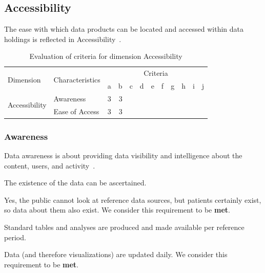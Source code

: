 \newpage
\subsection{Accessibility}

The ease with which data products can be located and accessed within data holdings is reflected in Accessibility~\cite{oecd}.

\begin{table}[htbp]
    \centering

    \begin{tabular}{llrrrrrrrrrr}
        \toprule
        \multirow{2}{*}{Dimension}      & \multirow{2}{*}{Characteristics}  & \multicolumn{10}{c}{Criteria}         \\ \cmidrule(lr){3-12}
                                        &                                   & a & b & c & d & e & f & g & h & i & j \\ \midrule
        \multirow{2}{*}{Accessibility}  & Awareness                         & 3 & 3 &   &   &   &   &   &   &   &   \\
                                        & Ease of Access                    & 3 & 3 &   &   &   &   &   &   &   &   \\
        \bottomrule
    \end{tabular}

    \caption{Evaluation of criteria for dimension Accessibility}
    \label{table:accessibility-benchmark}
\end{table}
\FloatBarrier

\subsubsection{Awareness}

Data awareness is about providing data visibility and intelligence about the content, users, and activity~\cite{data-awareness}.

\begin{QandA}
    \item The existence of the data can be ascertained.
    \begin{answered}
        Yes, the public cannot look at reference data sources, but patients certainly exist, so data about them also exist.
        We consider this requirement to be \textbf{met}.
    \end{answered}

    \item Standard tables and analyses are produced and made available per reference period.
    \begin{answered}
        Data (and therefore visualizations) are updated daily.
        We consider this requirement to be \textbf{met}.
    \end{answered}

\end{QandA}

